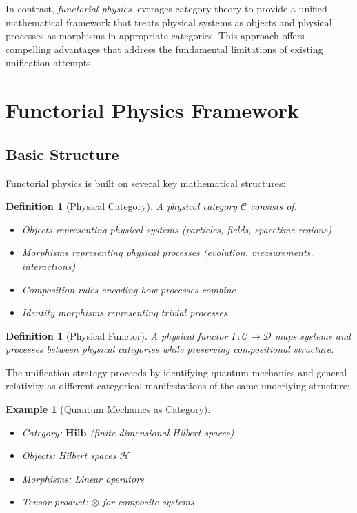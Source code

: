 \documentclass[11pt,a4paper]{article}
\newtheorem{definition}[theorem]{Definition}
\newtheorem{example}[theorem]{Example}
\newcommand{\Hilb}{\mathbf{Hilb}}
\begin{document}
In contrast, \emph{functorial physics} leverages category theory to provide a unified mathematical framework that treats physical systems as objects and physical processes as morphisms in appropriate categories. This approach offers compelling advantages that address the fundamental limitations of existing unification attempts.

\section{Functorial Physics Framework}

\subsection{Basic Structure}

Functorial physics is built on several key mathematical structures:

\begin{definition}[Physical Category]
A \emph{physical category} $\mathcal{C}$ consists of:
\begin{itemize}
    \item Objects representing physical systems (particles, fields, spacetime regions)
    \item Morphisms representing physical processes (evolution, measurements, interactions)
    \item Composition rules encoding how processes combine
    \item Identity morphisms representing trivial processes
\end{itemize}
\end{definition}

\begin{definition}[Physical Functor]
A \emph{physical functor} $F: \mathcal{C} \to \mathcal{D}$ maps systems and processes between physical categories while preserving compositional structure.
\end{definition}

The unification strategy proceeds by identifying quantum mechanics and general relativity as different categorical manifestations of the same underlying structure:

\begin{example}[Quantum Mechanics as Category]
\begin{itemize}
    \item Category: $\Hilb$ (finite-dimensional Hilbert spaces)
    \item Objects: Hilbert spaces $\mathcal{H}$
    \item Morphisms: Linear operators
    \item Tensor product: $\otimes$ for composite systems
\end{itemize}
\end{example}
\end{document}
